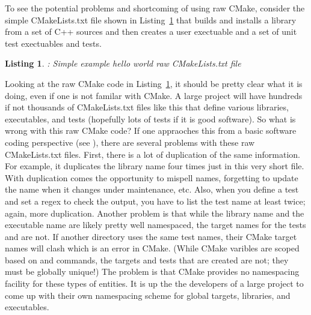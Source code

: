 \documentclass[10pt]{article}
\newtheorem{listing}{Listing}
\begin{document}
To see the potential problems and shortcoming of using raw CMake, consider the simple CMakeLists.txt file shown in Listing~\ref{listing:RawHelloWorld} that builds and installs a library from a set of C++ sources and then creates a user exectuable and a set of unit test exectuables and tests.

\begin{listing}: Simple example hello world raw CMakeLists.txt file
\label{listing:RawHelloWorld}
{\small

}
\end{listing}

Looking at the raw CMake code in Listing~\ref{listing:RawHelloWorld}, it should be pretty clear what it is doing, even if one is not familar with CMake.  A large project will have hundreds if not thousands of CMakeLists.txt files like this that define various libraries, executables, and tests (hopefully lots of tests if it is good software).  So what is wrong with this raw CMake code?  If one appraoches this from a basic software coding perspective (see \cite{CodeComplete2nd04}), there are several problems with these raw CMakeLists.txt files.  First, there is a lot of duplication of the same information.  For example, it duplicates the library name  four times just in this very short file.  With duplication comes the opportunity to mispell names, forgetting to update the name when it changes under maintenance, etc.  Also, when you define a test and set a regex to check the output, you have to list the test name at least twice; again, more duplication.  Another problem is that while the library name  and the executable name  are likely pretty well namespaced, the target names for the tests  and  are not.  If another directory uses the same test names, their CMake target names will clash which is an error in CMake.  (While CMake varibles are scoped based on  and  commands, the targets and tests that are created are not; they must be globally unique!)  The problem is that CMake provides no namespacing facility for these types of entities.  It is up the the developers of a large project to come up with their own namespacing scheme for global targets, libraries, and executables.
\end{document}
